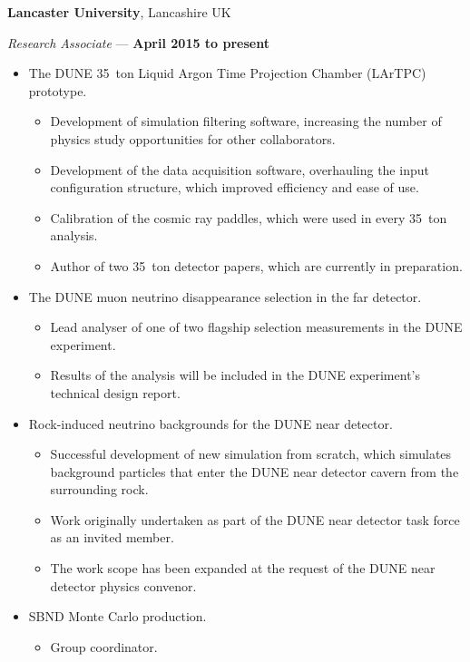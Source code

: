 \documentclass[margin,line]{res}
\begin{document}
\begin{resume}
{\bf Lancaster University}, Lancashire UK

\vspace{-.3cm}
{\em Research Associate} --- {\bf April 2015 to present}%
\begin{itemize}
\item The DUNE 35~ton Liquid Argon Time Projection Chamber (LArTPC) prototype.
\begin{itemize}
\item Development of simulation filtering software, increasing the number of physics study opportunities for other collaborators.
\item Development of the data acquisition software, overhauling the input configuration structure, which improved efficiency and ease of use.
\item Calibration of the cosmic ray paddles, which were used in every 35~ton analysis.
\item Author of two 35~ton detector papers, which are currently in preparation.
\end{itemize}
\item The DUNE muon neutrino disappearance selection in the far detector.
\begin{itemize}
\item Lead analyser of one of two flagship selection measurements in the DUNE experiment.
\item Results of the analysis will be included in the DUNE experiment's technical design report.
\end{itemize}
\item Rock-induced neutrino backgrounds for the DUNE near detector.
\begin{itemize}
\item Successful development of new simulation from scratch, which simulates background particles that enter the DUNE near detector cavern from the surrounding rock.
\item Work originally undertaken as part of the DUNE near detector task force as an invited member.
\item The work scope has been expanded at the request of the DUNE near detector physics convenor.
\end{itemize}
\item SBND Monte Carlo production.
\begin{itemize}
\item Group coordinator.

\end{itemize}
\end{itemize}
\end{resume}
\end{document}
